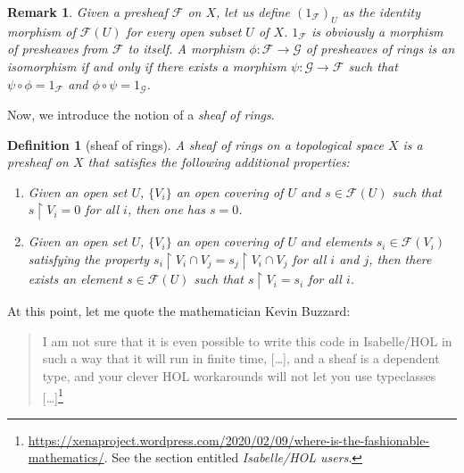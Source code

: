 \documentclass[12pt]{scrartcl}
\newtheorem{definition}[proposition]{Definition}
\newtheorem{remark}[proposition]{Remark}
\begin{document}
\begin{remark}
	Given a presheaf $\mathscr{F}$ on $X$, let us define $(1_{\mathscr{F}})_U$ as the identity morphism of $\mathscr{F}(U)$ for every open subset $U$ of $X$. $1_{\mathscr{F}}$ is obviously a morphism of presheaves from $\mathscr{F}$ to itself. A morphism $\phi: \mathscr{F} \rightarrow \mathscr{G}$ of presheaves of rings is an isomorphism if and only if there exists a morphism $\psi: \mathscr{G} \rightarrow \mathscr{F}$ such that $\psi \circ \phi = 1_{\mathscr{F}}$ and $\phi \circ \psi = 1_{\mathscr{G}}$.  
\end{remark}


Now, we introduce the notion of a \emph{sheaf of rings}. 			

\begin{definition}[sheaf of rings]
	A sheaf of rings on a topological space $X$ is a presheaf on $X$ that satisfies the following additional properties:
	\begin{enumerate}
		\item[(locality)] Given an open set $U$, $\lbrace V_i \rbrace$ an open covering of $U$ and $s \in \mathscr{F}(U)$ such that $s \restriction V_i = 0$ for all $i$, then one has $s = 0$.
		\item[(glueing)] Given an open set $U$, $\lbrace V_i \rbrace$ an open covering of $U$ and elements $s_i \in \mathscr{F}(V_i)$ satisfying the property $s_i \restriction V_i \cap V_j = s_j \restriction V_i \cap V_j$ for all $i$ and $j$, then there exists an element $s \in \mathscr{F}(U)$ such that $s \restriction V_i = s_i$ for all $i$.  
	\end{enumerate}	
\end{definition}

 
At this point, let me quote the mathematician Kevin Buzzard:
\begin{quote}
	I am not sure that it is even possible to write this code in Isabelle/HOL in such a way that it will run in finite time, [\dots], and a sheaf is a dependent type, and your clever HOL workarounds will not let you use typeclasses [\dots]\footnote{\url{https://xenaproject.wordpress.com/2020/02/09/where-is-the-fashionable-mathematics/}. See the section entitled \textit{Isabelle/HOL users}.}
\end{quote}
\end{document}
